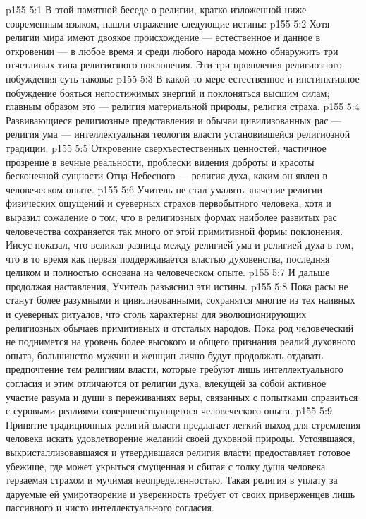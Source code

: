 \vs p155 5:1 В этой памятной беседе о религии, кратко изложенной ниже современным языком, нашли отражение следующие истины:
\vs p155 5:2 \pc Хотя религии мира имеют двоякое происхождение --- естественное и данное в откровении --- в любое время и среди любого народа можно обнаружить три отчетливых типа религиозного поклонения. Эти три проявления религиозного побуждения суть таковы:
\vs p155 5:3 \bibnobreakspace {} В какой\hyp{}то мере естественное и инстинктивное побуждение бояться непостижимых энергий и поклоняться высшим силам; главным образом это --- религия материальной природы, религия страха.
\vs p155 5:4 \pc {}\bibnobreakspace {} Развивающиеся религиозные представления и обычаи цивилизованных рас --- религия ума --- интеллектуальная теология власти установившейся религиозной традиции.
\vs p155 5:5 \pc {}\bibnobreakspace {} Откровение сверхъестественных ценностей, частичное прозрение в вечные реальности, проблески видения доброты и красоты бесконечной сущности Отца Небесного --- религия духа, каким он явлен в человеческом опыте.
\vs p155 5:6 \pc Учитель не стал умалять значение религии физических ощущений и суеверных страхов первобытного человека, хотя и выразил сожаление о том, что в религиозных формах наиболее развитых рас человечества сохраняется так много от этой примитивной формы поклонения. Иисус показал, что великая разница между религией ума и религией духа в том, что в то время как первая поддерживается властью духовенства, последняя целиком и полностью основана на человеческом опыте.
\vs p155 5:7 \pc И дальше продолжая наставления, Учитель разъяснил эти истины.
\vs p155 5:8 \pc Пока расы не станут более разумными и цивилизованными, сохранятся многие из тех наивных и суеверных ритуалов, что столь характерны для эволюционирующих религиозных обычаев примитивных и отсталых народов. Пока род человеческий не поднимется на уровень более высокого и общего признания реалий духовного опыта, большинство мужчин и женщин лично будут продолжать отдавать предпочтение тем религиям власти, которые требуют лишь интеллектуального согласия и этим отличаются от религии духа, влекущей за собой активное участие разума и души в переживаниях веры, связанных с попытками справиться с суровыми реалиями совершенствующегося человеческого опыта.
\vs p155 5:9 Принятие традиционных религий власти предлагает легкий выход для стремления человека искать удовлетворение желаний своей духовной природы. Устоявшаяся, выкристаллизовавшаяся и утвердившаяся религия власти предоставляет готовое убежище, где может укрыться смущенная и сбитая с толку душа человека, терзаемая страхом и мучимая неопределенностью. Такая религия в уплату за даруемые ей умиротворение и уверенность требует от своих приверженцев лишь пассивного и чисто интеллектуального согласия.
